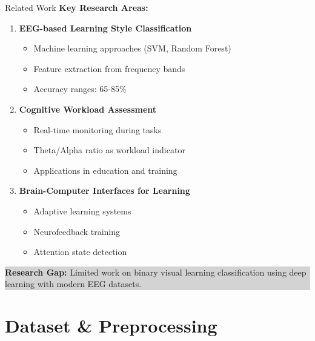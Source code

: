 \documentclass[aspectratio=169]{beamer}
\begin{document}
\begin{frame}{Related Work}
\textbf{Key Research Areas:}

\begin{enumerate}
    \item \textbf{EEG-based Learning Style Classification}
    \begin{itemize}
        \item Machine learning approaches (SVM, Random Forest)
        \item Feature extraction from frequency bands
        \item Accuracy ranges: 65-85\%
    \end{itemize}
    
    \vspace{2mm}
    
    \item \textbf{Cognitive Workload Assessment}
    \begin{itemize}
        \item Real-time monitoring during tasks
        \item Theta/Alpha ratio as workload indicator
        \item Applications in education and training
    \end{itemize}
    
    \vspace{2mm}
    
    \item \textbf{Brain-Computer Interfaces for Learning}
    \begin{itemize}
        \item Adaptive learning systems
        \item Neurofeedback training
        \item Attention state detection
    \end{itemize}
\end{enumerate}

\vspace{3mm}

\colorbox{lightgray}{\parbox{0.95\textwidth}{
\textbf{Research Gap:} Limited work on binary visual learning classification using deep learning with modern EEG datasets.
}}
\end{frame}

\section{Dataset \& Preprocessing}
\end{document}
